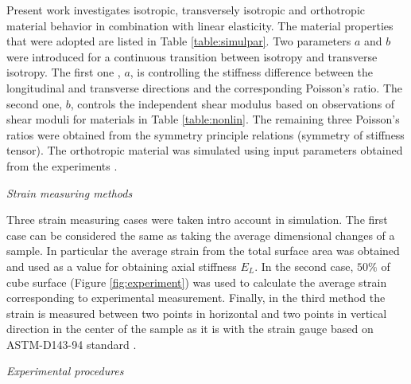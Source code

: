 \documentclass[review]{elsarticle}
\begin{document}
Present work investigates isotropic, transversely isotropic and orthotropic
material behavior in combination with linear elasticity.
The material properties that were adopted are listed in
Table \ref{table:simulpar}. Two parameters $a$ and $b$ were introduced for a continuous transition between isotropy and transverse isotropy. 
The first one , $a$, is controlling the stiffness difference between the
longitudinal and transverse directions and the corresponding Poisson's ratio.
The second one, $b$, controls the independent shear modulus based on
observations of shear moduli for materials in Table \ref{table:nonlin}.
The remaining three Poisson's ratios were obtained from the symmetry
principle relations (symmetry of stiffness tensor\cite{hyer2009stress}). The
orthotropic material was simulated using input parameters obtained from the experiments \cite{vorobyevcharacterisation}.


\begin{description}
\item{\textit{Strain measuring methods}}
\end{description}


Three strain measuring cases were taken intro account in simulation. The first
case can be considered the same as taking the average dimensional changes of a
sample. In particular the average strain from the total surface area was
obtained and used as a value for obtaining axial stiffness $E_L$. In the
second case, $50\%$ of cube surface (Figure \ref{fig:experiment}) was
used to calculate the average strain corresponding to experimental measurement. 
Finally, in the third method the strain is measured between two points
in horizontal and two points in vertical direction in the center of the sample
as it is with the strain gauge based on ASTM-D143-94 standard
\cite{american2009standard}.

\begin{description}
\item{\textit{Experimental procedures}}
\end{description}
\end{document}
